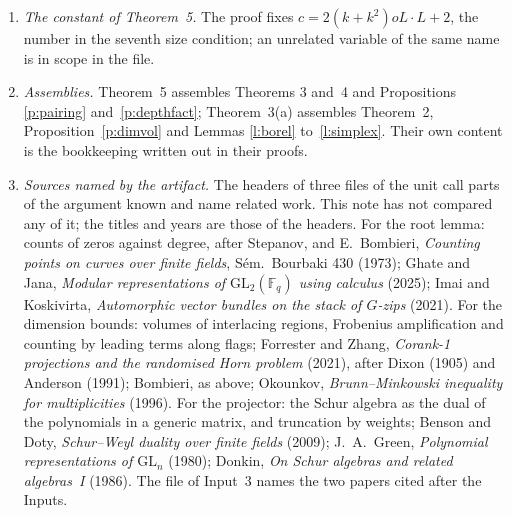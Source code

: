 \documentclass[11pt,a4paper]{article}
\newcommand{\m}[1]{\mbox{$#1$}}        %
\theoremstyle{plainx}
\theoremstyle{uprightx}
\newcommand{\cO}{\mathcal{O}}
\begin{document}
\begin{enumerate}[label=\textup{\arabic*.},leftmargin=1.6em,itemsep=5pt]
the image of~$\Psi$ a square matrix with determinant dividing \m{p^{l}} moves it into
\m{Y(\operatorname{im}\Psi)+p^{e}\operatorname{im}\Psi}. Nothing is assumed about torsion in~$V$, and the residue
field of~$\cO$, over which the dimensions of Theorem~3 are taken in the proof, is not the residue field
of~$W$.
\item \emph{The constant of Theorem~5.} The proof fixes \m{c=2(k+k^{2})oL\cdot L+2}, the number in the seventh
size condition; an unrelated variable of the same name is in scope in the file.
\item \emph{Assemblies.} Theorem~5 assembles Theorems 3 and~4 and Propositions \ref{p:pairing}
and~\ref{p:depthfact}; Theorem~3(a) assembles Theorem~2, Proposition~\ref{p:dimvol} and Lemmas \ref{l:borel}
to~\ref{l:simplex}. Their own content is the bookkeeping written out in their proofs.
\item \emph{Sources named by the artifact.} The headers of three files of the unit call parts of the argument
known and name related work. This note has not compared any of it; the titles and years are those of the headers.
For the root lemma: counts of zeros against degree, after Stepanov, and E.~Bombieri, \emph{Counting points on
curves over finite fields}, S\'em.\ Bourbaki 430 (1973); Ghate and Jana, \emph{Modular representations of
\m{\mathrm{GL}_2(\mathbb{F}_q)} using calculus} (2025); Imai and Koskivirta, \emph{Automorphic vector bundles on
the stack of $G$-zips} (2021). For the dimension bounds: volumes of interlacing regions, Frobenius amplification
and counting by leading terms along flags; Forrester and Zhang, \emph{Corank-1 projections and the randomised
Horn problem} (2021), after Dixon (1905) and Anderson (1991); Bombieri, as above; Okounkov,
\emph{Brunn--Minkowski inequality for multiplicities} (1996). For the projector: the Schur algebra as the dual of
the polynomials in a generic matrix, and truncation by weights; Benson and Doty, \emph{Schur--Weyl duality over
finite fields} (2009); J.~A.~Green, \emph{Polynomial representations of \m{\mathrm{GL}_n}} (1980); Donkin,
\emph{On Schur algebras and related algebras~I} (1986). The file of Input~3 names the two papers cited after the
Inputs.
\end{enumerate}
\end{document}
